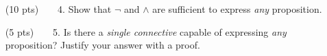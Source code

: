 \begin{enumerate}
  \item[(10 pts)~~~~4.]
    Show that $\neg$ and $\land$ are sufficient to express \emph{any} proposition.
  \item[(5 pts)~~~~5.]
    Is there a \emph{single connective} capable of expressing \emph{any} proposition?%
    Justify your answer with a proof.
\end{enumerate}


